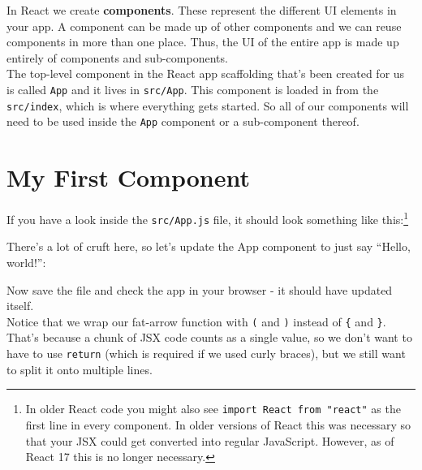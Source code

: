 In React we create \textbf{components}. These represent the different UI elements in your app. A component can be made up of other components and we can reuse components in more than one place. Thus, the UI of the entire app is made up entirely of components and sub-components.
\\

The top-level component in the React app scaffolding that's been created for us is called \texttt{App} and it lives in \texttt{src/App}. This component is loaded in from the \texttt{src/index}, which is where everything gets started. So all of our components will need to be used inside the \texttt{App} component or a sub-component thereof.


\pagebreak


\section{My First Component}

If you have a look inside the \texttt{src/App.js} file, it should look something like this:\footnote{In older React code you might also see \texttt{import React from "react"} as the first line in every component. In older versions of React this was necessary so that your JSX could get converted into regular JavaScript. However, as of React 17 this is no longer necessary.}


There's a lot of cruft here, so let's update the App component to just say ``Hello, world!'':


Now save the file and check the app in your browser - it should have updated itself.
\\

Notice that we wrap our fat-arrow function with \texttt{(} and \texttt{)} instead of \texttt{\{} and \texttt{\}}. That's because a chunk of JSX code counts as a single value, so we don't want to have to use \texttt{return} (which is required if we used curly braces), but we still want to split it onto multiple lines.
\\

